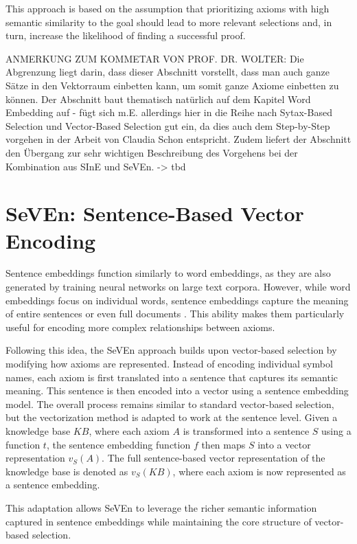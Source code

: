 \documentclass[english,version-2020-11]{uzl-thesis}
\begin{document}
This approach is based on the assumption that prioritizing axioms with high semantic similarity to the goal should lead to more relevant selections and, in turn, increase the likelihood of finding a successful proof.

ANMERKUNG ZUM KOMMETAR VON PROF. DR. WOLTER:  
Die Abgrenzung liegt darin, dass dieser Abschnitt vorstellt, dass man auch ganze Sätze in den Vektorraum einbetten kann, um somit ganze Axiome einbetten zu können. Der Abschnitt baut thematisch natürlich auf dem Kapitel Word Embedding auf - fügt sich m.E. allerdings hier in die Reihe nach Sytax-Based Selection und Vector-Based Selection gut ein, da dies auch dem Step-by-Step vorgehen in der Arbeit von Claudia Schon entspricht. Zudem liefert der Abschnitt den Übergang zur sehr wichtigen Beschreibung des Vorgehens bei der Kombination aus SInE und SeVEn.  
-> tbd  

\section{SeVEn: Sentence-Based Vector Encoding}

Sentence embeddings function similarly to word embeddings, as they are also generated by training neural networks on large text corpora. However, while word embeddings focus on individual words, sentence embeddings capture the meaning of entire sentences or even full documents \cite{Kiros2015SkipThought}. This ability makes them particularly useful for encoding more complex relationships between axioms.

Following this idea, the SeVEn approach builds upon vector-based selection by modifying how axioms are represented. Instead of encoding individual symbol names, each axiom is first translated into a sentence that captures its semantic meaning. This sentence is then encoded into a vector using a sentence embedding model. The overall process remains similar to standard vector-based selection, but the vectorization method is adapted to work at the sentence level. Given a knowledge base \( KB \), where each axiom \( A \) is transformed into a sentence \( S \) using a function \( t \), the sentence embedding function \( f \) then maps \( S \) into a vector representation \( v_S(A) \). The full sentence-based vector representation of the knowledge base is denoted as \( v_S(KB) \), where each axiom is now represented as a sentence embedding.

This adaptation allows SeVEn to leverage the richer semantic information captured in sentence embeddings while maintaining the core structure of vector-based selection.
\end{document}
